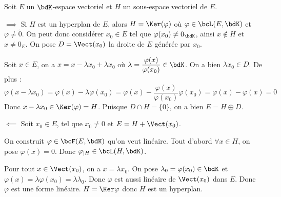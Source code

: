 \documentclass[a4paper,french,bookmarks]{article}
\begin{document}
\begin{enumerate}
    \noafter 
    \nobefore\yesafter
    \begin{nproof}
         Soit $E$ un $\bdK$-espace vectoriel et $H$ un sous-espace
         vectoriel de $E$.
         
         \begin{enumerate}
             \itt $\boxed{\implies}$ Si $H$ est un hyperplan de $E$,
             alors $H = \Ker(\varphi)$ où $\varphi \in \bcL(E, \bdK)$ et
             $\varphi \neq \widetilde 0$. On peut donc considérer $x_0
             \in E$ tel que $\varphi(x_0) \neq 0_\bdK$, ainsi $x \not
             \in H$ et $x \neq 0_E$. On pose $D = \Vect(x_0)$ la droite
             de $E$ générée par $x_0$.
             
             Soit $x \in E$, on a  $x = x - \lambda x_0 + \lambda x_0$
             où $\lambda = \dfrac{\varphi(x)}{\varphi(x_0)} \in \bdK$.
             On a bien $\lambda x_0 \in D$. De plus :
             \[ \varphi(x - \lambda x_0) = \varphi(x) - \lambda
             \varphi(x_0) = \varphi(x) -
             \dfrac{\varphi(x)}{\varphi(x_0)}\varphi(x_0) = \varphi(x) -
             \varphi(x) = 0\]
             Donc $x - \lambda x_0 \in \Ker(\varphi) = H$. Puisque $D
             \cap H = \{0\}$, on a bien $E = H \oplus D$.
             
             \itt $\boxed{\impliedby}$ Soit $x_0 \in E$, tel que $x_0
             \neq 0$ et $E = H + \Vect(x_0)$.
             
             On construit $\varphi \in \bcF(E, \bdK)$ qu'on veut
             linéaire. Tout d'abord $\forall x \in H$, on pose
             $\varphi(x) = 0$. Donc $\varphi_{\vert H} \in \bcL(H,
             \bdK)$. 
             
             Pour tout $x \in \Vect(x_0)$, on a $x = \lambda x_0$. On
             pose $\lambda_0 = \varphi(x_0) \in \bdK$ et $\varphi(x) =
             \lambda \varphi(x_0) = \lambda \lambda_0$. Donc $\varphi$
             est aussi linéaire de $\Vect(x_0)$ dans $E$. Donc
             $\varphi$ est une forme linéaire. $H = \Ker \varphi$ donc
             $H$ est un hyperplan.
         \end{enumerate}
    \end{nproof}
    \yesbefore
\end{enumerate}
\end{document}
